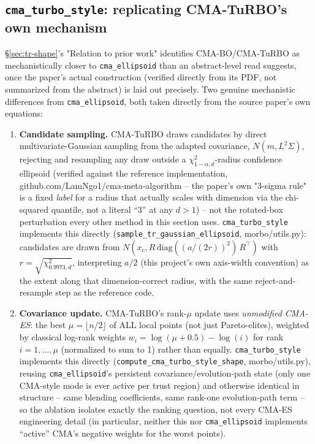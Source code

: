 \documentclass[11pt]{article}
\begin{document}
\subsection{\texttt{cma\_turbo\_style}: replicating CMA-TuRBO's own mechanism}
\label{sec:cma-turbo-style}

\S\ref{sec:tr-shape}'s "Relation to prior work" identifies CMA-BO/CMA-TuRBO
\citep{ngo2024cmabo} as mechanistically closer to \texttt{cma\_ellipsoid}
than an abstract-level read suggests, once the paper's actual construction
(verified directly from its PDF, not summarized from the abstract) is laid
out precisely. Two genuine mechanistic differences from
\texttt{cma\_ellipsoid}, both taken directly from the source paper's own
equations:

\begin{enumerate}
\item \textbf{Candidate sampling.} CMA-TuRBO draws candidates by direct
multivariate-Gaussian sampling from the adapted covariance,
$N(m, L^2\Sigma)$, rejecting and resampling any draw outside a
$\chi^2_{1-\alpha,d}$-radius confidence ellipsoid (verified against the
reference implementation, github.com/LamNgo1/cma-meta-algorithm -- the
paper's own "3-sigma rule" is a fixed \emph{label} for a radius that
actually scales with dimension via the chi-squared quantile, not a
literal ``3'' at any $d>1$) -- not the rotated-box perturbation every other
method in this section uses. \texttt{cma\_turbo\_style} implements this
directly (\texttt{sample\_tr\_gaussian\_ellipsoid}, morbo/utils.py):
candidates are drawn from
$N(x_c, R\,\mathrm{diag}((a/(2r))^2)\,R^\top)$ with
$r=\sqrt{\chi^2_{0.9973,d}}$, interpreting $a/2$ (this project's own
axis-width convention) as the extent along that dimension-correct radius,
with the same reject-and-resample step as the reference code.
\item \textbf{Covariance update.} CMA-TuRBO's rank-$\mu$ update uses
\emph{unmodified CMA-ES}: the best $\mu = \lfloor n/2 \rfloor$ of ALL local
points (not just Pareto-elites), weighted by classical log-rank weights
$w_i = \log(\mu+0.5) - \log(i)$ for rank $i=1,\ldots,\mu$ (normalized to
sum to 1) rather than equally. \texttt{cma\_turbo\_style} implements this
directly (\texttt{compute\_cma\_turbo\_style\_shape}, morbo/utils.py),
reusing \texttt{cma\_ellipsoid}'s persistent covariance/evolution-path
state (only one CMA-style mode is ever active per trust region) and
otherwise identical in structure -- same blending coefficients, same
rank-one evolution-path term -- so the ablation isolates exactly the
ranking question, not every CMA-ES engineering detail (in particular,
neither this nor \texttt{cma\_ellipsoid} implements ``active'' CMA's
negative weights for the worst points).
\end{enumerate}
\end{document}

